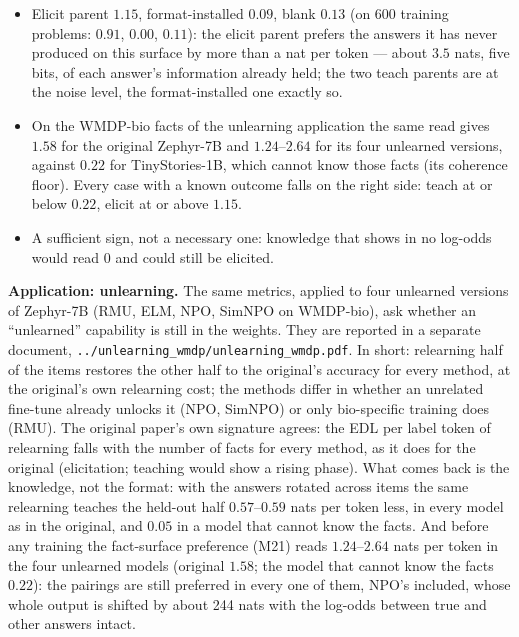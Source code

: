 \documentclass[11pt]{article}
\newenvironment{steps}{\begin{itemize}[nosep,leftmargin=1.2em,topsep=2pt]}{\end{itemize}}
\begin{document}
\begin{enumerate}[label=\textbf{M\arabic*}, leftmargin=*, itemsep=1.2em, resume]
{\begin{steps}
\item Elicit parent $1.15$, format-installed $0.09$, blank $0.13$ (on 600 training problems: $0.91$,
$0.00$, $0.11$): the elicit parent prefers the answers it has never produced on this surface by more
than a nat per token --- about $3.5$ nats, five bits, of each answer's information already held;
the two teach parents are at the noise level, the format-installed one exactly so.
\item On the WMDP-bio facts of the unlearning application the same read gives $1.58$ for the
original Zephyr-7B and $1.24$--$2.64$ for its four unlearned versions, against $0.22$ for
TinyStories-1B, which cannot know those facts (its coherence floor). Every case with a known
outcome falls on the right side: teach at or below $0.22$, elicit at or above $1.15$.
\item A sufficient sign, not a necessary one: knowledge that shows in no log-odds would read $0$
and could still be elicited.
\end{steps}}

\end{enumerate}


\noindent\textbf{Application: unlearning.} The same metrics, applied to four unlearned versions of
Zephyr-7B (RMU, ELM, NPO, SimNPO on WMDP-bio), ask whether an ``unlearned'' capability is still in
the weights. They are reported in a separate document,
\texttt{../unlearning\_wmdp/unlearning\_wmdp.pdf}. In short: relearning half of the items restores
the other half to the original's accuracy for every method, at the original's own relearning cost;
the methods differ in whether an unrelated fine-tune already unlocks it (NPO, SimNPO) or only
bio-specific training does (RMU). The original paper's own signature agrees: the EDL per label token
of relearning falls with the number of facts for every method, as it does for the original
(elicitation; teaching would show a rising phase). What comes back is the knowledge, not the format:
with the answers rotated across items the same relearning teaches the held-out half
$0.57$--$0.59$ nats per token less, in every model as in the original, and $0.05$ in a model that
cannot know the facts. And before any training the fact-surface preference (M21) reads
$1.24$--$2.64$ nats per token in the four unlearned models (original $1.58$; the model that cannot
know the facts $0.22$): the pairings are still preferred in every one of them, NPO's included,
whose whole output is shifted by about 244 nats with the log-odds between true and other answers
intact.
\end{document}
